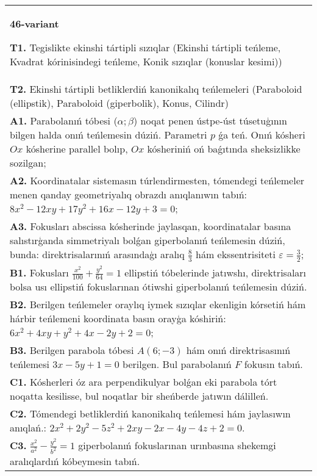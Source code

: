 \documentclass{article}
\begin{document}
\begin{tabular}{m{17cm}}
\textbf{46-variant}
\newline

\textbf{T1.} Tegislikte ekinshi tártipli sızıqlar (Ekinshi tártipli teńleme, Kvadrat kórinisindegi teńleme, Konik sızıqlar (konuslar kesimi)) \\
\textbf{T2.} Ekinshi tártipli betliklerdiń kanonikalıq teńlemeleri (Paraboloid (ellipstik), Paraboloid (giperbolik), Konus, Cilindr) \\
\textbf{A1.} Parabolanıń tóbesi ($\alpha;\beta$) noqat penen ústpe-úst túsetuģının bilgen halda onıń teńlemesin dúziń. Parametri $p$ ǵa teń. Onıń kósheri $O x$ kósherine parallel bolıp, $O x$ kósheriniń oń baǵıtında sheksizlikke sozilgan; \\
\textbf{A2.} Koordinatalar sistemasın túrlendirmesten, tómendegi teńlemeler menen qanday geometriyalıq obrazdı anıqlanıwın tabıń: $8 x^2-12 x y+17 y^2+16 x-12 y+3=0$; \\
\textbf{A3.} Fokusları abscissa kósherinde jaylasqan, koordinatalar basına salıstırģanda simmetriyalı bolǵan giperbolanıń teńlemesin dúziń, bunda: direktrisalarınıń arasındaģı aralıq $\frac{8}{3}$ hám ekssentrisiteti $\varepsilon=\frac{3}{2}$; \\
\textbf{B1.} Fokusları $\frac{x^2}{100}+\frac{y^2}{64}=1$ ellipstiń tóbelerinde jatıwshı, direktrisaları bolsa usı ellipstiń fokuslarınan ótiwshi giperbolanıń teńlemesin dúziń. \\
\textbf{B2.} Berilgen teńlemeler oraylıq iymek sızıqlar ekenligin kórsetiń hám hárbir teńlemeni koordinata basın orayģa kóshiriń: $6 x^2+4 x y+y^2+4 x-2 y+2=0$; \\
\textbf{B3.} Berilgen parabola tóbesi $A (6;-3) $ hám onıń direktrisasınıń teńlemesi $3x-5y+1=0$ berilgen. Bul parabolanıń $F$ fokusın tabıń. \\
\textbf{C1.} Kósherleri óz ara perpendikulyar bolǵan eki parabola tórt noqatta kesilisse, bul noqatlar bir sheńberde jatıwın dálilleń. \\
\textbf{C2.} Tómendegi betliklerdiń kanonikalıq teńlemesi hám jaylasıwın anıqlań.: $2 x^2+2 y^2-5 z^2+2 x y-2 x-4 y-4 z+2=0$. \\
\textbf{C3.} $\frac{x^2}{a^2}-\frac{y^2}{b^2}=1$ giperbolanıń fokuslarınan urınbasına shekemgi aralıqlardıń kóbeymesin tabıń. \\

\end{tabular}
\vspace{1cm}
\end{document}
